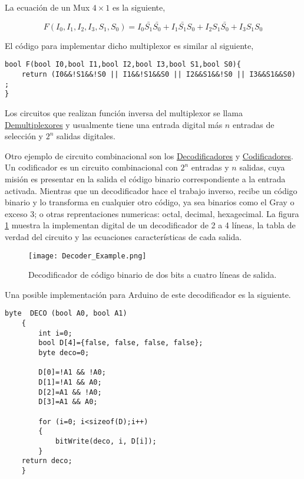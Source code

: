 La ecuación de un Mux $4 \times 1$ es la siguiente,

\begin{equation}
	F(I_0,I_1,I_2,I_3,S_1,S_0)=I_0\bar{S_1}\bar{S_0}+I_1\bar{S_1}S_0+I_2S_1\bar{S_0}+I_3S_1S_0
\end{equation} 

El código para implementar dicho multiplexor es similar al siguiente,
{\footnotesize 
\begin{lstlisting}[language=Arduino,numbers=none, showstringspaces=false]
bool F(bool I0,bool I1,bool I2,bool I3,bool S1,bool S0){
	return (I0&&!S1&&!S0 || I1&&!S1&&S0 || I2&&S1&&!S0 || I3&&S1&&S0) ;
}
\end{lstlisting}
}
Los circuitos que realizan función inversa del multiplexor se  llama \href{https://es.wikipedia.org/wiki/Demultiplexor}{Demultiplexores}  y usualmente tiene una entrada digital más $n$ entradas de selección y $2^{n}$ salidas digitales.

Otro ejemplo de circuito combinacional son los \href{URL}{Decodificadores} y \href{https://es.wikipedia.org/wiki/Codificador}{Codificadores}.  Un codificador es un circuito combinacional con $2^{n}$ entradas y $n$ salidas, cuya misión es presentar en la salida el código binario correspondiente a la entrada activada. Mientras que un decodificador hace el trabajo inverso, recibe un código binario y lo transforma en cualquier otro código, ya sea  binarios como el Gray o exceso 3; o otras reprentaciones numericas: octal, decimal, hexagecimal. La figura \ref{fig:decoderexample} muestra la implementan digital de un decodificador de 2 a 4 líneas, la tabla de verdad del circuito y las ecuaciones características de cada salida. 
\begin{figure}
	\centering
	\texttt{[image: Decoder\_Example.png]}
	\caption{Decodificador de código binario de dos bits a cuatro líneas de salida.  }
	\label{fig:decoderexample}
\end{figure}

Una posible implementación para Arduino de este decodificador es la siguiente.

\begin{lstlisting}[language=Arduino,numbers=none, showstringspaces=false]
	byte  DECO (bool A0, bool A1)
	{
		int i=0;
		bool D[4]={false, false, false, false};
		byte deco=0;
	
		D[0]=!A1 && !A0;
		D[1]=!A1 && A0;
		D[2]=A1 && !A0;
		D[3]=A1 && A0;
	
		for (i=0; i<sizeof(D);i++)
		{
			bitWrite(deco, i, D[i]);
		}
	return deco;
	}
\end{lstlisting}
  

